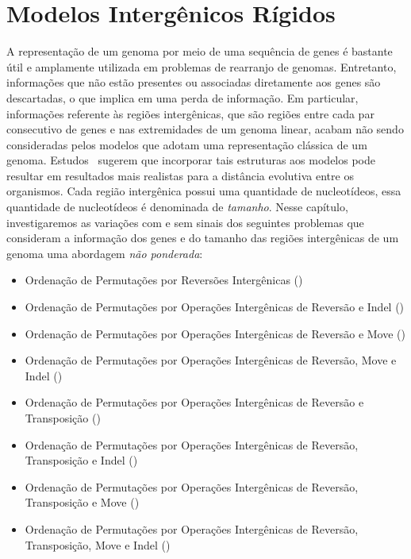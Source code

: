 \chapter{Modelos Intergênicos Rígidos}\label{chapter:DOVAEMLI}

A representação de um genoma por meio de uma sequência de genes é bastante útil e amplamente utilizada em problemas de rearranjo de genomas. Entretanto, informações que não estão presentes ou associadas diretamente aos genes são descartadas, o que implica em uma perda de informação. Em particular, informações referente às regiões intergênicas, que são regiões entre cada par consecutivo de genes e nas extremidades de um genoma linear, acabam não sendo consideradas pelos modelos que adotam uma representação clássica de um genoma. Estudos~\cite{2016a-biller-etal, 2016b-biller-etal} sugerem que incorporar tais estruturas aos modelos pode resultar em resultados mais realistas para a distância evolutiva entre os organismos. Cada região intergênica possui uma quantidade de nucleotídeos, essa quantidade de nucleotídeos é denominada de \emph{tamanho}. Nesse capítulo, investigaremos as variações com e sem sinais dos seguintes problemas que consideram a informação dos genes e do tamanho das regiões intergênicas de um genoma uma abordagem \emph{não ponderada}:

\begin{itemize}
  \item Ordenação de Permutações por Reversões Intergênicas (\SbIR)
  \item Ordenação de Permutações por Operações Intergênicas de Reversão e Indel (\SbIRI)
  \item Ordenação de Permutações por Operações Intergênicas de Reversão e Move \break (\SbIRM)
  \item Ordenação de Permutações por Operações Intergênicas de Reversão, Move e Indel (\SbIRMI)
  \item Ordenação de Permutações por Operações Intergênicas de Reversão e Transposição (\SbIRT)
  \item Ordenação de Permutações por Operações Intergênicas de Reversão, Transposição e Indel (\SbIRTI)
  \item Ordenação de Permutações por Operações Intergênicas de Reversão, Transposição e Move (\SbIRTM)
  \item Ordenação de Permutações por Operações Intergênicas de Reversão, Transposição, Move e Indel (\SbIRTMI)
\end{itemize}

